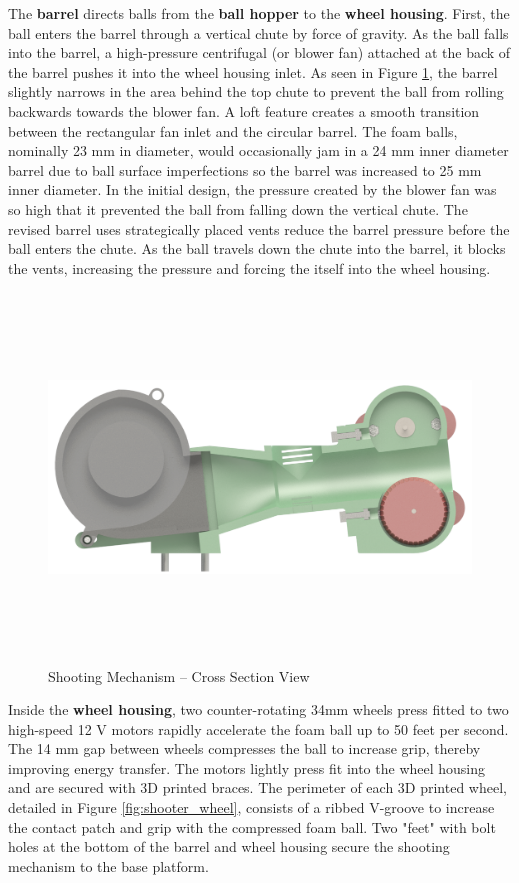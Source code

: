 The \textbf{barrel} directs balls from the \textbf{ball hopper} to the \textbf{wheel housing}. First, the ball enters the barrel through a vertical chute by force of gravity. As the ball falls into the barrel, a high-pressure centrifugal (or blower fan) attached at the back of the barrel pushes it into the wheel housing inlet. As seen in Figure \ref{fig:shooter_xsec}, the barrel slightly narrows in the area behind the top chute to prevent the ball from rolling backwards towards the blower fan. A loft feature creates a smooth transition between the rectangular fan inlet and the circular barrel. The foam balls, nominally 23 mm in diameter, would occasionally jam in a 24 mm inner diameter barrel due to ball surface imperfections so the barrel was increased to 25 mm inner diameter. In the initial design, the pressure created by the blower fan was so high that it prevented the ball from falling down the vertical chute. The revised barrel uses strategically placed vents reduce the barrel pressure before the ball enters the chute. As the ball travels down the chute into the barrel, it blocks the vents, increasing the pressure and forcing the itself into the wheel housing.

\begin{figure}[H]   %
	\centering \includegraphics[width=6in, height=3.85in, keepaspectratio]{figures/shooter_xsec.png}
	\caption{Shooting Mechanism -- Cross Section View}	\label{fig:shooter_xsec}
\end{figure}

Inside the \textbf{wheel housing}, two counter-rotating 34mm wheels press fitted to two high-speed 12 V motors rapidly accelerate the foam ball up to 50 feet per second. The 14 mm gap between wheels compresses the ball to increase grip, thereby improving energy transfer. The motors lightly press fit into the wheel housing and are secured with 3D printed braces. The perimeter of each 3D printed wheel, detailed in Figure \ref{fig:shooter_wheel}, consists of a ribbed V-groove to increase the contact patch and grip with the compressed foam ball. Two "feet" with bolt holes at the bottom of the barrel and wheel housing secure the shooting mechanism to the base platform.

